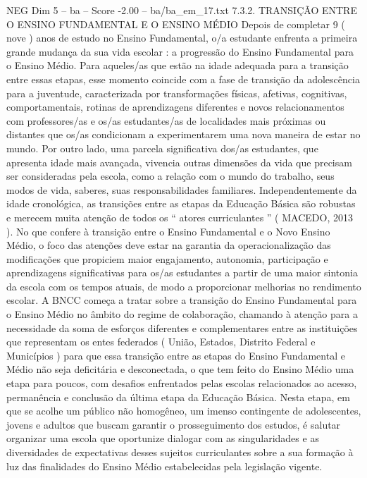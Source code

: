 \begin{textsample}{NEG Dim 5 – ba – Score -2.00 – ba/ba\_em\_17.txt}  \label{ex:f5_neg_016}
7.3.2.
TRANSIÇÃO ENTRE O ENSINO FUNDAMENTAL E O ENSINO MÉDIO Depois de completar 9 ( nove ) anos de estudo no Ensino Fundamental, o/a estudante enfrenta a primeira grande mudança da sua vida escolar : a progressão do Ensino Fundamental para o Ensino Médio.
Para aqueles/as que estão na idade adequada para a transição entre essas etapas, esse momento coincide com a fase de transição da adolescência para a juventude, caracterizada por transformações físicas, afetivas, cognitivas, comportamentais, rotinas de aprendizagens diferentes e novos relacionamentos com professores/as e os/as estudantes/as de localidades mais próximas ou distantes que os/as condicionam a experimentarem uma nova maneira de estar no mundo.
Por outro lado, uma parcela significativa dos/as estudantes, que apresenta idade mais avançada, vivencia outras dimensões da vida que precisam ser consideradas pela escola, como a relação com o mundo do trabalho, seus modos de vida, saberes, suas responsabilidades familiares.
Independentemente da idade cronológica, as transições entre as etapas da Educação Básica são robustas e merecem muita atenção de todos os “ atores curriculantes ” ( MACEDO, 2013 ).
No que confere à transição entre o Ensino Fundamental e o Novo Ensino Médio, o foco das atenções deve estar na garantia da operacionalização das modificações que propiciem maior engajamento, autonomia, participação e aprendizagens significativas para os/as estudantes a partir de uma maior sintonia da escola com os tempos atuais, de modo a proporcionar melhorias no rendimento escolar.
A BNCC começa a tratar sobre a transição do Ensino Fundamental para o Ensino Médio no âmbito do regime de colaboração, chamando à atenção para a necessidade da soma de esforços diferentes e complementares entre as instituições que representam os entes federados ( União, Estados, Distrito Federal e Municípios ) para que essa transição entre as etapas do Ensino Fundamental e Médio não seja deficitária e desconectada, o que tem feito do Ensino Médio uma etapa para poucos, com desafios enfrentados pelas escolas relacionados ao acesso, permanência e conclusão da última etapa da Educação Básica.
Nesta etapa, em que se acolhe um público não homogêneo, um imenso contingente de adolescentes, jovens e adultos que buscam garantir o prosseguimento dos estudos, é salutar organizar uma escola que oportunize dialogar com as singularidades e as diversidades de expectativas desses sujeitos curriculantes sobre a sua formação à luz das finalidades do Ensino Médio estabelecidas pela legislação vigente.

\end{textsample}
